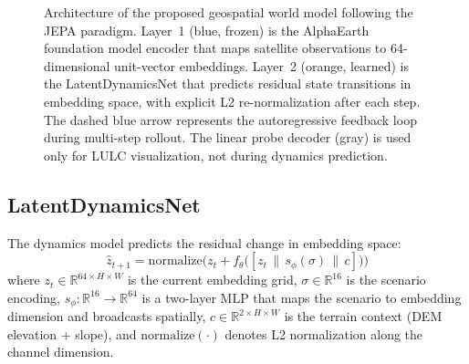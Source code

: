 \documentclass{article}
\begin{document}
\begin{figure}[htbp]
\caption{Architecture of the proposed geospatial world model following the JEPA paradigm. Layer~1 (blue, frozen) is the AlphaEarth foundation model encoder that maps satellite observations to 64-dimensional unit-vector embeddings. Layer~2 (orange, learned) is the LatentDynamicsNet that predicts residual state transitions in embedding space, with explicit L2 re-normalization after each step. The dashed blue arrow represents the autoregressive feedback loop during multi-step rollout. The linear probe decoder (gray) is used only for LULC visualization, not during dynamics prediction.}
\label{fig:architecture}
\end{figure}

\subsection{LatentDynamicsNet}
\label{sec:network}

The dynamics model predicts the residual change in embedding space:
\begin{equation}
\hat{z}_{t+1} = \text{normalize}\Big(z_t + f_\theta\big([z_t \,\|\, s_\phi(\sigma) \,\|\, c]\big)\Big)
\label{eq:dynamics}
\end{equation}
where $z_t \in \mathbb{R}^{64 \times H \times W}$ is the current embedding grid, $\sigma \in \mathbb{R}^{16}$ is the scenario encoding, $s_\phi: \mathbb{R}^{16} \to \mathbb{R}^{64}$ is a two-layer MLP that maps the scenario to embedding dimension and broadcasts spatially, $c \in \mathbb{R}^{2 \times H \times W}$ is the terrain context (DEM elevation + slope), and $\text{normalize}(\cdot)$ denotes L2 normalization along the channel dimension.
\end{document}

